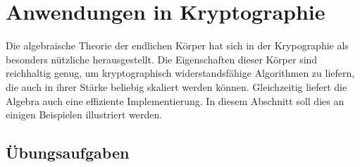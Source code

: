 %
%
%
\chapter{Anwendungen in Kryptographie
\label{buch:chapter:kryptographie}}
\rhead{}
Die algebraische Theorie der endlichen Körper hat sich
in der Krypographie als besonders nützliche herausgestellt.
Die Eigenschaften dieser Körper sind reichhaltig genug, um 
kryptographisch widerstandsfähige Algorithmen zu liefern, die
auch in ihrer Stärke beliebig skaliert werden können.
Gleichzeitig liefert die Algebra auch eine effiziente Implementierung.
In diesem Abschnitt soll dies an einigen Beispielen illustriert werden.





%

\section*{Übungsaufgaben}
\begin{uebungsaufgaben}
\end{uebungsaufgaben}

